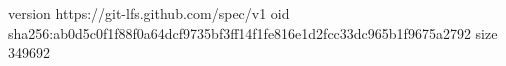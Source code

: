 version https://git-lfs.github.com/spec/v1
oid sha256:ab0d5c0f1f88f0a64dcf9735bf3ff14f1fe816e1d2fcc33dc965b1f9675a2792
size 349692
